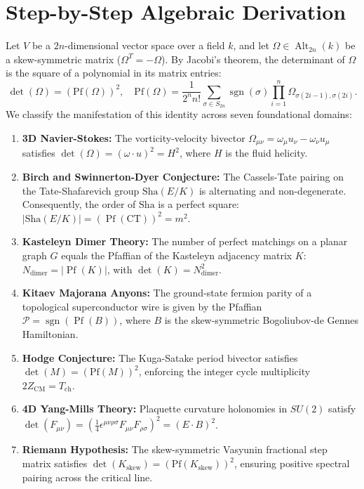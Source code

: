 \documentclass[11pt,a4paper]{article}
\providecommand{\Sha}{\mathrm{Sha}}
\theoremstyle{definition}
\begin{document}
\section{Step-by-Step Algebraic Derivation}

Let $V$ be a $2n$-dimensional vector space over a field $k$, and let $\Omega \in \operatorname{Alt}_{2n}(k)$ be a skew-symmetric matrix ($\Omega^T = -\Omega$). By Jacobi's theorem, the determinant of $\Omega$ is the square of a polynomial in its matrix entries:
\begin{equation}
\det(\Omega) = (\mathrm{Pf}(\Omega))^2, \quad \mathrm{Pf}(\Omega) = \frac{1}{2^n n!} \sum_{\sigma \in S_{2n}} \operatorname{sgn}(\sigma) \prod_{i=1}^n \Omega_{\sigma(2i-1), \sigma(2i)}.
\end{equation}
We classify the manifestation of this identity across seven foundational domains:
\begin{enumerate}
\item \textbf{3D Navier-Stokes:} The vorticity-velocity bivector $\Omega_{\mu\nu} = \omega_\mu u_\nu - \omega_\nu u_\mu$ satisfies $\det(\Omega) = (\omega \cdot u)^2 = H^2$, where $H$ is the fluid helicity.
\item \textbf{Birch and Swinnerton-Dyer Conjecture:} The Cassels-Tate pairing on the Tate-Shafarevich group $\Sha(E/K)$ is alternating and non-degenerate. Consequently, the order of $\Sha$ is a perfect square: $|\Sha(E/K)| = (\operatorname{Pf}(\mathrm{CT}))^2 = m^2$.
\item \textbf{Kasteleyn Dimer Theory:} The number of perfect matchings on a planar graph $G$ equals the Pfaffian of the Kasteleyn adjacency matrix $K$: $N_{\mathrm{dimer}} = |\operatorname{Pf}(K)|$, with $\det(K) = N_{\mathrm{dimer}}^2$.
\item \textbf{Kitaev Majorana Anyons:} The ground-state fermion parity of a topological superconductor wire is given by the Pfaffian $\mathcal{P} = \operatorname{sgn}(\operatorname{Pf}(B))$, where $B$ is the skew-symmetric Bogoliubov-de Gennes Hamiltonian.
\item \textbf{Hodge Conjecture:} The Kuga-Satake period bivector satisfies $\det(M) = (\mathrm{Pf}(M))^2$, enforcing the integer cycle multiplicity $2 Z_{\mathrm{CM}} = T_{\mathrm{ch}}$.
\item \textbf{4D Yang-Mills Theory:} Plaquette curvature holonomies in $SU(2)$ satisfy $\det(F_{\mu\nu}) = (\frac{1}{4} \epsilon^{\mu\nu\rho\sigma} F_{\mu\nu} F_{\rho\sigma})^2 = (E \cdot B)^2$.
\item \textbf{Riemann Hypothesis:} The skew-symmetric Vasyunin fractional step matrix satisfies $\det(K_{\mathrm{skew}}) = (\mathrm{Pf}(K_{\mathrm{skew}}))^2$, ensuring positive spectral pairing across the critical line.
\end{enumerate}
\end{document}
